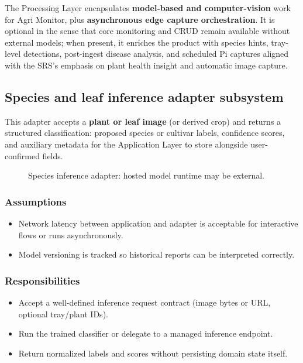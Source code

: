 The Processing Layer encapsulates \textbf{model-based and computer-vision} work for Agri Monitor, plus \textbf{asynchronous edge capture orchestration}. It is optional in the sense that core monitoring and CRUD remain available without external models; when present, it enriches the product with species hints, tray-level detections, post-ingest disease analysis, and scheduled Pi captures aligned with the SRS's emphasis on plant health insight and automatic image capture.

\subsection{Species and leaf inference adapter subsystem}

This adapter accepts a \textbf{plant or leaf image} (or derived crop) and returns a structured classification: proposed species or cultivar labels, confidence scores, and auxiliary metadata for the Application Layer to store alongside user-confirmed fields.

\begin{figure}[H]
\centering
{}
\caption{Species inference adapter: hosted model runtime may be external.}
\label{fig:proc-species}
\end{figure}

\subsubsection{Assumptions}
\begin{itemize}
  \item Network latency between application and adapter is acceptable for interactive flows or runs asynchronously.
  \item Model versioning is tracked so historical reports can be interpreted correctly.
\end{itemize}

\subsubsection{Responsibilities}
\begin{itemize}
  \item Accept a well-defined inference request contract (image bytes or URL, optional tray/plant IDs).
  \item Run the trained classifier or delegate to a managed inference endpoint.
  \item Return normalized labels and scores without persisting domain state itself.
\end{itemize}

